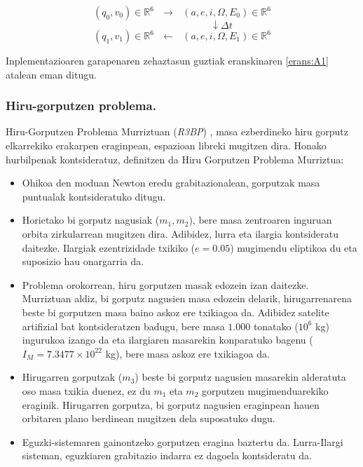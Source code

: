 \begin{equation*}
(q_0,v_0) \in \mathbb{R}^6 \ \ \ \longrightarrow \ \ \  (a,e,i,\Omega,E_0) \in \mathbb{R}^6 
\end{equation*}
\begin{equation*}
\quad \quad \quad \quad \quad \quad \quad \quad \downarrow \Delta t
\end{equation*}
\begin{equation*}
(q_1,v_1) \in \mathbb{R}^6 \ \ \ \longleftarrow \ \ \  (a,e,i,\Omega,E_1) \in \mathbb{R}^6 
\end{equation*}

Inplementazioaren garapenaren zehaztasun guztiak eranskinaren \ref{erans:A1} atalean eman ditugu.

\subsubsection*{Hiru-gorputzen problema.}

Hiru-Gorputzen Problema Murriztuan (\emph{R3BP}) \cite{Hairer1993,Corless2013},  
masa ezberdineko hiru gorputz elkarrekiko erakarpen eraginpean, espazioan libreki mugitzen dira. Honako hurbilpenak kontsideratuz, definitzen da Hiru Gorputzen Problema Murriztua:

\begin{itemize}
\item Ohikoa den moduan Newton eredu grabitazionalean, gorputzak masa puntualak kontsideratuko ditugu. 
\item  Horietako bi gorputz nagusiak ($m_1,m_2$), bere masa zentroaren inguruan orbita zirkularrean mugitzen dira. Adibidez, lurra eta ilargia kontsideratu daitezke. Ilargiak ezentrizidade txikiko ($e=0.05$) mugimendu eliptikoa du eta suposizio hau onargarria da.
\item Problema orokorrean, hiru gorputzen masak edozein izan daitezke. Murriztuan aldiz, bi gorputz nagusien masa edozein delarik, hirugarrenarena beste bi gorputzen masa baino askoz ere txikiagoa da. Adibidez satelite artifizial bat kontsideratzen badugu, bere masa $1.000$ tonatako ($10^6$ kg) ingurukoa izango da  eta ilargiaren masarekin konparatuko bagenu ($I_M=7.3477 \times 10^{22}$ kg), bere masa askoz ere txikiagoa da.
\item Hirugarren gorputzak ($m_3$) beste bi gorputz nagusien masarekin alderatuta oso masa txikia duenez, ez du $m_1$ eta $m_2$ gorputzen mugimenduarekiko eraginik. Hirugarren gorputza, bi gorputz nagusien eraginpean hauen orbitaren plano berdinean mugitzen dela suposatuko dugu.
\item Eguzki-sistemaren gainontzeko gorputzen eragina baztertu da. Lurra-Ilargi sisteman, eguzkiaren grabitazio indarra ez dagoela kontsideratu da. 
\end{itemize} 


